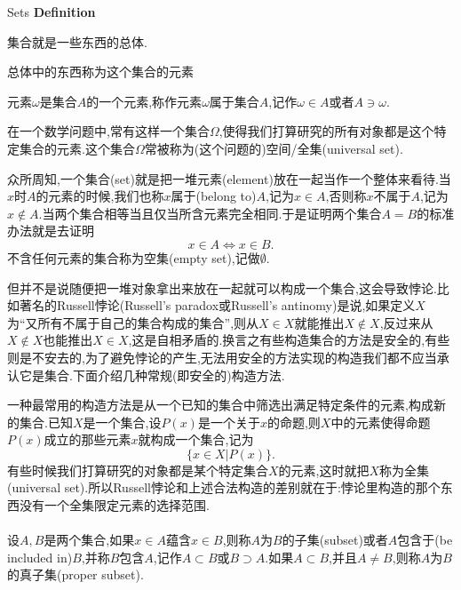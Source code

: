 {Sets}
\textbf{Definition}
\begin{blist}
	\item 集合就是一些东西的总体.
	\item 总体中的东西称为这个集合的元素
	\item 元素$\omega$是集合$A$的一个元素,称作元素$\omega$属于集合$A$,记作$\omega\in A$或者$A\ni\omega$.
	\item 在一个数学问题中,常有这样一个集合$\Omega$,使得我们打算研究的所有对象都是这个特定集合的元素.这个集合$\Omega$常被称为(这个问题的)空间/全集(universal set).
\end{blist}	




众所周知,一个集合(set)就是把一堆元素(element)放在一起当作一个整体来看待.当$x$时$A$的元素的时候,我们也称$x$属于(belong to)$A$,记为$x\in A$,否则称$x$不属于$A$,记为$x\notin A$.当两个集合相等当且仅当所含元素完全相同.于是证明两个集合$A=B$的标准办法就是去证明\begin{equation}
x\in A\Longleftrightarrow x\in B.
\end{equation}
不含任何元素的集合称为空集(empty set),记做$\emptyset$.


但并不是说随便把一堆对象拿出来放在一起就可以构成一个集合,这会导致悖论.比如著名的Russell悖论(Russell's paradox或Russell's antinomy)是说,如果定义$X$为“又所有不属于自己的集合构成的集合”,则从$X\in X$就能推出$X\notin X$,反过来从$X\notin X$也能推出$X\in X$,这是自相矛盾的.换言之有些构造集合的方法是安全的,有些则是不安去的,为了避免悖论的产生,无法用安全的方法实现的构造我们都不应当承认它是集合.下面介绍几种常规(即安全的)构造方法.



一种最常用的构造方法是从一个已知的集合中筛选出满足特定条件的元素,构成新的集合.已知$X$是一个集合,设$P(x)$是一个关于$x$的命题,则$X$中的元素使得命题$P(x)$成立的那些元素$x$就构成一个集合,记为\begin{equation}
\{x\in X|P(x) \}.
\end{equation}
有些时候我们打算研究的对象都是某个特定集合$X$的元素,这时就把$X$称为全集(universal set).所以Russell悖论和上述合法构造的差别就在于:悖论里构造的那个东西没有一个全集限定元素的选择范围.
\\ \hspace*{\fill} \\%
设$A,B$是两个集合,如果$x\in A$蕴含$x\in B$,则称$A$为$B$的子集(subset)或者$A$包含于(be included in)$B$,并称$B$包含$A$,记作$A\subset B$或$B\supset A$.如果$A\subset B$,并且$A\neq B$,则称$A$为$B$的真子集(proper subset).





